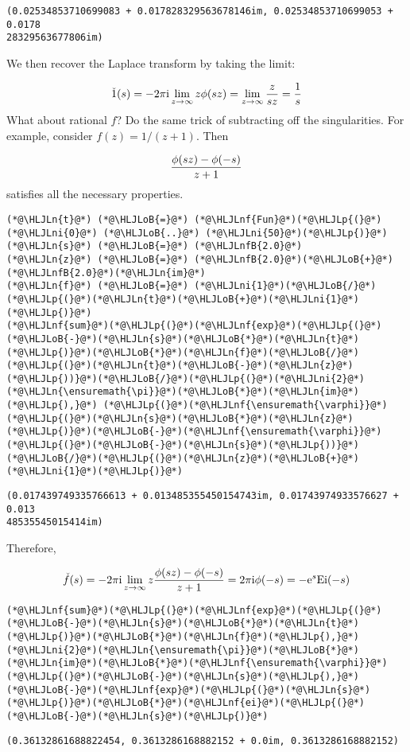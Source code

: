 \documentclass[12pt,a4paper]{article}
\newcommand{\HLJLn}[1]{#1}
\newcommand{\HLJLnf}[1]{\textcolor[RGB]{66,102,213}{#1}}
\newcommand{\HLJLnfB}[1]{\textcolor[RGB]{59,151,46}{#1}}
\newcommand{\HLJLni}[1]{\textcolor[RGB]{59,151,46}{#1}}
\newcommand{\HLJLoB}[1]{\textcolor[RGB]{102,102,102}{\textbf{#1}}}
\newcommand{\HLJLp}[1]{#1}
\def\I{ {\rm i} }
\def\E{ {\rm e} }
\begin{document}
\begin{lstlisting}
(0.02534853710699083 + 0.017828329563678146im, 0.02534853710699053 + 0.0178
28329563677806im)
\end{lstlisting}


We then recover the Laplace transform by taking the limit:

\[
\check 1(s) = -2 \pi \I  \lim_{z\rightarrow \infty} z \phi(s z) =
\lim_{z\rightarrow \infty} {z \over s z} = {1 \over s}
\]
What about rational $f$? Do the same trick of subtracting off the singularities. For example, consider $f(z) = 1/(z+1)$. Then

\[
{\phi(s z) - \phi(-s) \over z+1}
\]
satisfies all the necessary properties.


\begin{lstlisting}
(*@\HLJLn{t}@*) (*@\HLJLoB{=}@*) (*@\HLJLnf{Fun}@*)(*@\HLJLp{(}@*)(*@\HLJLni{0}@*) (*@\HLJLoB{..}@*) (*@\HLJLni{50}@*)(*@\HLJLp{)}@*)
(*@\HLJLn{s}@*) (*@\HLJLoB{=}@*) (*@\HLJLnfB{2.0}@*)
(*@\HLJLn{z}@*) (*@\HLJLoB{=}@*) (*@\HLJLnfB{2.0}@*)(*@\HLJLoB{+}@*)(*@\HLJLnfB{2.0}@*)(*@\HLJLn{im}@*)
(*@\HLJLn{f}@*) (*@\HLJLoB{=}@*) (*@\HLJLni{1}@*)(*@\HLJLoB{/}@*)(*@\HLJLp{(}@*)(*@\HLJLn{t}@*)(*@\HLJLoB{+}@*)(*@\HLJLni{1}@*)(*@\HLJLp{)}@*)
(*@\HLJLnf{sum}@*)(*@\HLJLp{(}@*)(*@\HLJLnf{exp}@*)(*@\HLJLp{(}@*)(*@\HLJLoB{-}@*)(*@\HLJLn{s}@*)(*@\HLJLoB{*}@*)(*@\HLJLn{t}@*)(*@\HLJLp{)}@*)(*@\HLJLoB{*}@*)(*@\HLJLn{f}@*)(*@\HLJLoB{/}@*)(*@\HLJLp{(}@*)(*@\HLJLn{t}@*)(*@\HLJLoB{-}@*)(*@\HLJLn{z}@*)(*@\HLJLp{))}@*)(*@\HLJLoB{/}@*)(*@\HLJLp{(}@*)(*@\HLJLni{2}@*)(*@\HLJLn{\ensuremath{\pi}}@*)(*@\HLJLoB{*}@*)(*@\HLJLn{im}@*)(*@\HLJLp{),}@*) (*@\HLJLp{(}@*)(*@\HLJLnf{\ensuremath{\varphi}}@*)(*@\HLJLp{(}@*)(*@\HLJLn{s}@*)(*@\HLJLoB{*}@*)(*@\HLJLn{z}@*)(*@\HLJLp{)}@*)(*@\HLJLoB{-}@*)(*@\HLJLnf{\ensuremath{\varphi}}@*)(*@\HLJLp{(}@*)(*@\HLJLoB{-}@*)(*@\HLJLn{s}@*)(*@\HLJLp{))}@*)(*@\HLJLoB{/}@*)(*@\HLJLp{(}@*)(*@\HLJLn{z}@*)(*@\HLJLoB{+}@*)(*@\HLJLni{1}@*)(*@\HLJLp{)}@*)
\end{lstlisting}

\begin{lstlisting}
(0.017439749335766613 + 0.013485355450154743im, 0.01743974933576627 + 0.013
48535545015414im)
\end{lstlisting}


Therefore,

\[
\check f(s) = -2 \pi \I  \lim_{z\rightarrow \infty} z {\phi(s z) - \phi(-s) \over z+1}  =
2 \pi \I \phi(-s) = -\E^{s} {\rm Ei}(-s)
\]

\begin{lstlisting}
(*@\HLJLnf{sum}@*)(*@\HLJLp{(}@*)(*@\HLJLnf{exp}@*)(*@\HLJLp{(}@*)(*@\HLJLoB{-}@*)(*@\HLJLn{s}@*)(*@\HLJLoB{*}@*)(*@\HLJLn{t}@*)(*@\HLJLp{)}@*)(*@\HLJLoB{*}@*)(*@\HLJLn{f}@*)(*@\HLJLp{),}@*) (*@\HLJLni{2}@*)(*@\HLJLn{\ensuremath{\pi}}@*)(*@\HLJLoB{*}@*)(*@\HLJLn{im}@*)(*@\HLJLoB{*}@*)(*@\HLJLnf{\ensuremath{\varphi}}@*)(*@\HLJLp{(}@*)(*@\HLJLoB{-}@*)(*@\HLJLn{s}@*)(*@\HLJLp{),}@*) (*@\HLJLoB{-}@*)(*@\HLJLnf{exp}@*)(*@\HLJLp{(}@*)(*@\HLJLn{s}@*)(*@\HLJLp{)}@*)(*@\HLJLoB{*}@*)(*@\HLJLnf{ei}@*)(*@\HLJLp{(}@*)(*@\HLJLoB{-}@*)(*@\HLJLn{s}@*)(*@\HLJLp{)}@*)
\end{lstlisting}

\begin{lstlisting}
(0.36132861688822454, 0.3613286168882152 + 0.0im, 0.3613286168882152)
\end{lstlisting}
\end{document}
